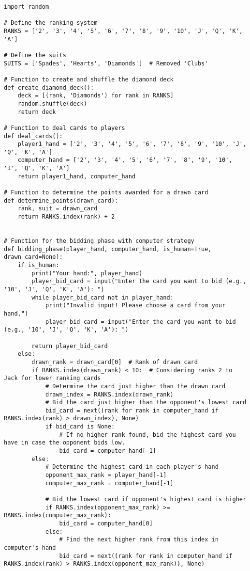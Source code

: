 \documentclass[10pt,onecolumn,letterpaper]{article}
\begin{document}
\begin{lstlisting}
import random

# Define the ranking system
RANKS = ['2', '3', '4', '5', '6', '7', '8', '9', '10', 'J', 'Q', 'K', 'A']

# Define the suits
SUITS = ['Spades', 'Hearts', 'Diamonds']  # Removed 'Clubs'

# Function to create and shuffle the diamond deck
def create_diamond_deck():
    deck = [(rank, 'Diamonds') for rank in RANKS]
    random.shuffle(deck)
    return deck

# Function to deal cards to players
def deal_cards():
    player1_hand = ['2', '3', '4', '5', '6', '7', '8', '9', '10', 'J', 'Q', 'K', 'A']
    computer_hand = ['2', '3', '4', '5', '6', '7', '8', '9', '10', 'J', 'Q', 'K', 'A']
    return player1_hand, computer_hand

# Function to determine the points awarded for a drawn card
def determine_points(drawn_card):
    rank, suit = drawn_card
    return RANKS.index(rank) + 2


# Function for the bidding phase with computer strategy
def bidding_phase(player_hand, computer_hand, is_human=True, drawn_card=None):
    if is_human:
        print("Your hand:", player_hand)
        player_bid_card = input("Enter the card you want to bid (e.g., '10', 'J', 'Q', 'K', 'A'): ")
        while player_bid_card not in player_hand:
            print("Invalid input! Please choose a card from your hand.")
            player_bid_card = input("Enter the card you want to bid (e.g., '10', 'J', 'Q', 'K', 'A'): ")

        return player_bid_card
    else:
        drawn_rank = drawn_card[0]  # Rank of drawn card
        if RANKS.index(drawn_rank) < 10:  # Considering ranks 2 to Jack for lower ranking cards
            # Determine the card just higher than the drawn card
            drawn_index = RANKS.index(drawn_rank)
            # Bid the card just higher than the opponent's lowest card
            bid_card = next((rank for rank in computer_hand if RANKS.index(rank) > drawn_index), None)
            if bid_card is None:
                # If no higher rank found, bid the highest card you have in case the opponent bids low.
                bid_card = computer_hand[-1]
        else:
            # Determine the highest card in each player's hand
            opponent_max_rank = player_hand[-1]
            computer_max_rank = computer_hand[-1]

            # Bid the lowest card if opponent's highest card is higher
            if RANKS.index(opponent_max_rank) >= RANKS.index(computer_max_rank):
                bid_card = computer_hand[0]
            else:
                # Find the next higher rank from this index in computer's hand
                bid_card = next((rank for rank in computer_hand if RANKS.index(rank) > RANKS.index(opponent_max_rank)), None)


\end{lstlisting}
\end{document}
